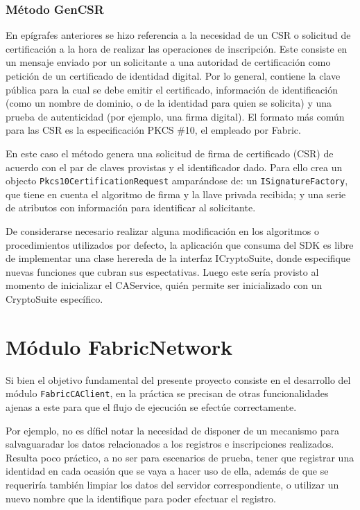 \subsubsection{M\'etodo GenCSR}
En ep\'igrafes anteriores se hizo referencia a la necesidad de un CSR o solicitud de certificación a la hora de realizar las operaciones de inscripci\'on. Este consiste en un mensaje enviado por un solicitante a una autoridad de certificación como petici\'on de un certificado de identidad digital. Por lo general, contiene la clave pública para la cual se debe emitir el certificado, información de identificación (como un nombre de dominio, o de la identidad para quien se solicita) y una prueba de autenticidad (por ejemplo, una firma digital). El formato más común para las CSR es la especificación PKCS \#10, el empleado por Fabric.

En este caso el m\'etodo genera una solicitud de firma de certificado (CSR) de acuerdo con el par de claves provistas y el identificador dado. Para ello crea un objecto \texttt{Pkcs10CertificationRequest} ampar\'andose de: un \texttt{ISignatureFactory}, que tiene en cuenta el algoritmo de firma y la llave privada recibida; y una serie de atributos con información para identificar al solicitante.



De considerarse necesario realizar alguna modificaci\'on en los algoritmos o procedimientos utilizados por defecto, la aplicaci\'on que consuma del SDK es libre de implementar una clase herereda de la interfaz ICryptoSuite, donde especifique nuevas funciones que cubran sus espectativas. Luego este ser\'ia provisto al momento de inicializar el CAService, qui\'en permite ser inicializado con un CryptoSuite espec\'ifico.

\section{M\'odulo FabricNetwork}
Si bien el objetivo fundamental del presente proyecto consiste en el desarrollo del m\'odulo \texttt{FabricCAClient}, en la pr\'actica se precisan de otras funcionalidades ajenas a este para que el flujo de ejecuci\'on se efect\'ue correctamente.

Por ejemplo, no es d\'ificl notar la necesidad de disponer de un mecanismo para salvaguaradar los datos relacionados a los registros e inscripciones realizados. Resulta poco pr\'actico, a no ser para escenarios de prueba, tener que registrar una identidad en cada ocasi\'on que se vaya a hacer uso de ella, adem\'as de que se requerir\'ia tambi\'en limpiar los datos del servidor correspondiente, o utilizar un nuevo nombre que la identifique para poder efectuar el registro. %

